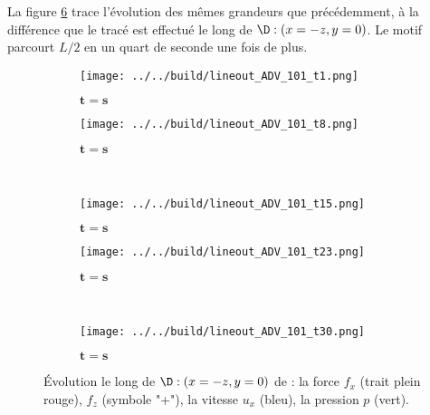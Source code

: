 La figure \ref{fig : 101} trace l'évolution des mêmes grandeurs que précédemment, à la différence que le tracé est effectué le long de $\D : (x=-z, y=0)$. Le motif parcourt $L/2$ en un quart de seconde une fois de plus. 



\begin{figure}
\begin{center}
	\begin{subfigure}[t]{0.4\textwidth}                                                                                                                                   
		\texttt{[image: ../../build/lineout\_ADV\_101\_t1.png]}
		\caption{ $\bm{t=s}$}
		\label{fig : 101_t1}
	\end{subfigure}\hfill
	\begin{subfigure}[t]{0.4\textwidth}
		\texttt{[image: ../../build/lineout\_ADV\_101\_t8.png]}
		\caption{ $\bm{t=s}$}
		\label{fig : 101_t6}
	\end{subfigure}
\\
	\begin{subfigure}[t]{0.4\textwidth}
		\texttt{[image: ../../build/lineout\_ADV\_101\_t15.png]}
		\caption{ $\bm{t=s}$}
		\label{fig : 101_t11}
	\end{subfigure}\hfill
	\begin{subfigure}[t]{0.4\textwidth}
		\texttt{[image: ../../build/lineout\_ADV\_101\_t23.png]}
		\caption{ $\bm{t=s}$}
		\label{fig : 101_t16}
	\end{subfigure}
\\
	\begin{subfigure}[t]{0.4\textwidth}
		\texttt{[image: ../../build/lineout\_ADV\_101\_t30.png]}
		\caption{ $\bm{t=s}$}
		\label{fig : 101_t21}
	\end{subfigure}	
\end{center}
\caption{Évolution le long de $\D : (x=-z, y=0)$ de : la force $f_x$ (trait plein rouge), $f_z$ (symbole "+"), la vitesse $u_x$ (bleu), la pression $p$ (vert).}
\label{fig : 101}
\end{figure}
